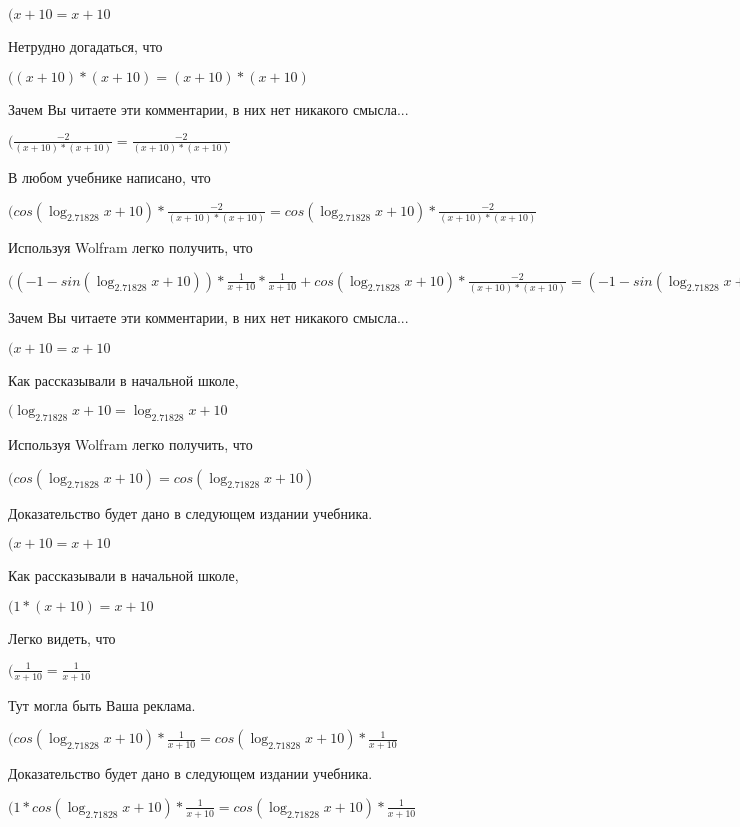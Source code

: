 \documentclass[12pt,a4paper,fleqn]{article}
\theoremstyle{definition}
\begin{document}
$( x  +  10  =  x  +  10 $

Нетрудно догадаться, что

$(( x  +  10 ) * ( x  +  10 ) = ( x  +  10 ) * ( x  +  10 )$

Зачем Вы читаете эти комментарии, в них нет никакого смысла...

$(\frac{ -2 }{( x  +  10 ) * ( x  +  10 )}
 = \frac{ -2 }{( x  +  10 ) * ( x  +  10 )}
$

В любом учебнике написано, что

$(cos(\log_{ 2.71828 }{ x  +  10 }) * \frac{ -2 }{( x  +  10 ) * ( x  +  10 )}
 = cos(\log_{ 2.71828 }{ x  +  10 }) * \frac{ -2 }{( x  +  10 ) * ( x  +  10 )}
$

Используя Wolfram легко получить, что

$(( -1  - sin(\log_{ 2.71828 }{ x  +  10 })) * \frac{ 1 }{ x  +  10 }
 * \frac{ 1 }{ x  +  10 }
 + cos(\log_{ 2.71828 }{ x  +  10 }) * \frac{ -2 }{( x  +  10 ) * ( x  +  10 )}
 = ( -1  - sin(\log_{ 2.71828 }{ x  +  10 })) * \frac{ 1 }{ x  +  10 }
 * \frac{ 1 }{ x  +  10 }
 + cos(\log_{ 2.71828 }{ x  +  10 }) * \frac{ -2 }{( x  +  10 ) * ( x  +  10 )}
$

Зачем Вы читаете эти комментарии, в них нет никакого смысла...

$( x  +  10  =  x  +  10 $

Как рассказывали в начальной школе,

$(\log_{ 2.71828 }{ x  +  10 } = \log_{ 2.71828 }{ x  +  10 }$

Используя Wolfram легко получить, что

$(cos(\log_{ 2.71828 }{ x  +  10 }) = cos(\log_{ 2.71828 }{ x  +  10 })$

Доказательство будет дано в следующем издании учебника.

$( x  +  10  =  x  +  10 $

Как рассказывали в начальной школе,

$( 1  * ( x  +  10 ) =  x  +  10 $

Легко видеть, что

$(\frac{ 1 }{ x  +  10 }
 = \frac{ 1 }{ x  +  10 }
$

Тут могла быть Ваша реклама.

$(cos(\log_{ 2.71828 }{ x  +  10 }) * \frac{ 1 }{ x  +  10 }
 = cos(\log_{ 2.71828 }{ x  +  10 }) * \frac{ 1 }{ x  +  10 }
$

Доказательство будет дано в следующем издании учебника.

$( 1  * cos(\log_{ 2.71828 }{ x  +  10 }) * \frac{ 1 }{ x  +  10 }
 = cos(\log_{ 2.71828 }{ x  +  10 }) * \frac{ 1 }{ x  +  10 }
$
\end{document}
